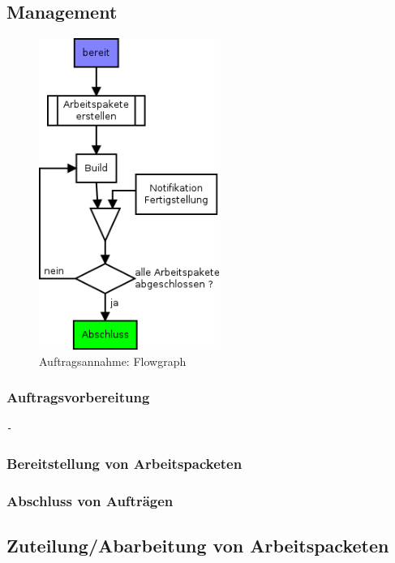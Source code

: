 \subsection{Management}

\begin{figure}[ht] 
  \centering
  \label{fig:lebenszyklus-auftrag-abarbeitung}
  \includegraphics[height=4in]{imageinput/lebenszyklus-auftrag-abarbeitung.png}
  \caption{Auftragsannahme: Flowgraph}
\end{figure}

\subsubsection{Auftragsvorbereitung}

\begin{verbatim}
- 
\end{verbatim}


\subsubsection{Bereitstellung von Arbeitspacketen}
\subsubsection{Abschluss von Auftr\"agen}


\subsection{Zuteilung/Abarbeitung von Arbeitspacketen}


